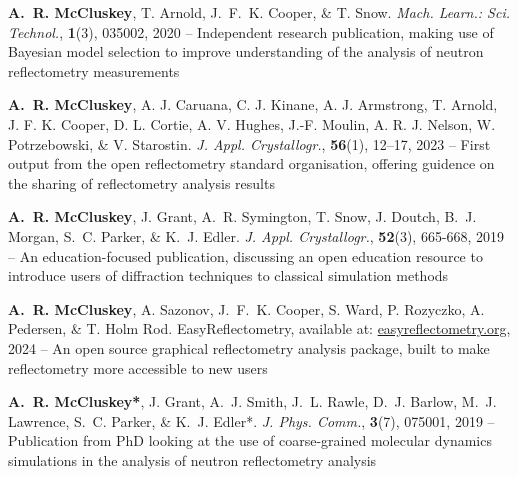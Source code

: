 \begin{cventriesy}
  \cventryy
    {
      \begin{cvitemsy}
        \item {\textbf{A.~R. McCluskey}, T. Arnold, J.~F.~K. Cooper, \& T. Snow. \emph{Mach. Learn.: Sci. Technol.}, \textbf{1}(3), 035002, 2020 -- Independent research publication, making use of Bayesian model selection to improve understanding of the analysis of neutron reflectometry measurements}
    \vspace{1mm}
        \item {\textbf{A.~R. McCluskey}, A. J. Caruana, C. J. Kinane, A. J. Armstrong, T. Arnold, J. F. K. Cooper, D. L. Cortie, A. V. Hughes, J.-F. Moulin, A. R. J. Nelson, W. Potrzebowski, \& V. Starostin. \emph{J. Appl. Crystallogr.}, \textbf{56}(1), 12--17, 2023 -- First output from the open reflectometry standard organisation, offering guidence on the sharing of reflectometry analysis results}
    \vspace{1mm}
        \item {\textbf{A.~R. McCluskey}, J. Grant, A.~R. Symington, T. Snow, J. Doutch, B.~J. Morgan, S.~C. Parker, \& K.~J. Edler. \emph{J. Appl. Crystallogr.}, \textbf{52}(3), 665-668, 2019 -- An education-focused publication, discussing an open education resource to introduce users of diffraction techniques to classical simulation methods}
    \vspace{1mm}
        \item {\textbf{A.~R. McCluskey}, A. Sazonov, J.~F.~K. Cooper, S. Ward, P. Rozyczko, A. Pedersen, \& T. Holm Rod. EasyReflectometry, available at: \href{https://easyreflectometry.org}{easyreflectometry.org}, 2024 -- An open source graphical reflectometry analysis package, built to make reflectometry more accessible to new users}
    \vspace{1mm}
        \item {\textbf{A.~R. McCluskey*}, J. Grant, A.~J. Smith, J.~L. Rawle, D.~J. Barlow, M.~J. Lawrence, S.~C. Parker, \& K.~J. Edler*. \emph{J. Phys. Comm.}, \textbf{3}(7), 075001, 2019 -- Publication from PhD looking at the use of coarse-grained molecular dynamics simulations in the analysis of neutron reflectometry analysis}
    \end{cvitemsy}
    }
\end{cventriesy}
